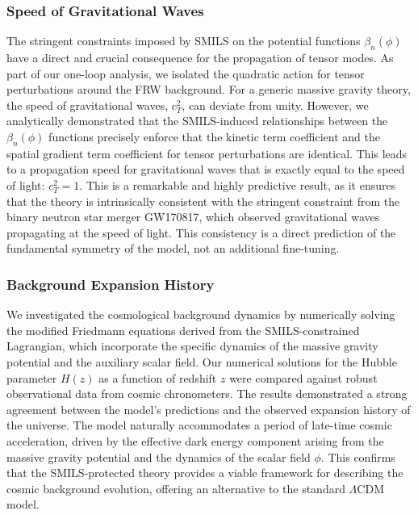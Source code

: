 \documentclass[twocolumn]{aastex631}
\begin{document}
\subsubsection{Speed of Gravitational Waves}
The stringent constraints imposed by SMILS on the potential functions $\beta_n(\phi)$ have a direct and crucial consequence for the propagation of tensor modes. As part of our one-loop analysis, we isolated the quadratic action for tensor perturbations around the FRW background. For a generic massive gravity theory, the speed of gravitational waves, $c_T^2$, can deviate from unity. However, we analytically demonstrated that the SMILS-induced relationships between the $\beta_n(\phi)$ functions precisely enforce that the kinetic term coefficient and the spatial gradient term coefficient for tensor perturbations are identical. This leads to a propagation speed for gravitational waves that is exactly equal to the speed of light: $c_T^2 = 1$. This is a remarkable and highly predictive result, as it ensures that the theory is intrinsically consistent with the stringent constraint from the binary neutron star merger GW170817, which observed gravitational waves propagating at the speed of light. This consistency is a direct prediction of the fundamental symmetry of the model, not an additional fine-tuning.

\subsubsection{Background Expansion History}
We investigated the cosmological background dynamics by numerically solving the modified Friedmann equations derived from the SMILS-constrained Lagrangian, which incorporate the specific dynamics of the massive gravity potential and the auxiliary scalar field. Our numerical solutions for the Hubble parameter $H(z)$ as a function of redshift $z$ were compared against robust observational data from cosmic chronometers. The results demonstrated a strong agreement between the model's predictions and the observed expansion history of the universe. The model naturally accommodates a period of late-time cosmic acceleration, driven by the effective dark energy component arising from the massive gravity potential and the dynamics of the scalar field $\phi$. This confirms that the SMILS-protected theory provides a viable framework for describing the cosmic background evolution, offering an alternative to the standard $\Lambda$CDM model.
\end{document}
